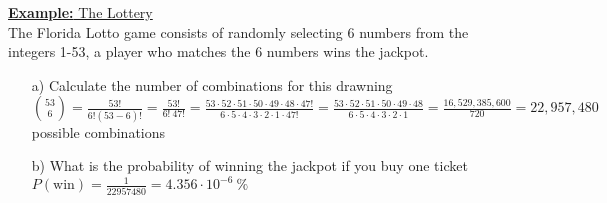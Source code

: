 \documentclass[a4paper]{article}
\let\bf\textbf
\begin{document}
\begin{shaded}
    \underline{\bf{Example:} The Lottery}
    \vspace{2mm}\\
    The Florida Lotto game consists of randomly selecting 6 numbers from the integers 1-53, a player who matches the 6 numbers wins the jackpot.
    \begin{itemize}
        \item[a)] Calculate the number of combinations for this drawning\\
        $\binom{53}{6} = \frac{53!}{6!(53-6)!} = \frac{53!}{6!\ 47!} = \frac{53 \cdot 52 \cdot 51 \cdot 50 \cdot 49 \cdot 48 \cdot 47!}{6 \cdot 5 \cdot 4 \cdot 3 \cdot 2 \cdot 1 \cdot 47!} = \frac{53 \cdot 52 \cdot 51 \cdot 50 \cdot 49 \cdot 48}{6 \cdot 5 \cdot 4 \cdot 3 \cdot 2 \cdot 1} = \frac{16,529,385,600}{720} = 22,957,480$ possible combinations
        \item[b)] What is the probability of winning the jackpot if you buy one ticket\\
        $P(\text{win}) = \frac{1}{22957480} = 4.356 \cdot 10^{-6}\ \%$
    \end{itemize}
\end{shaded}
\end{document}
